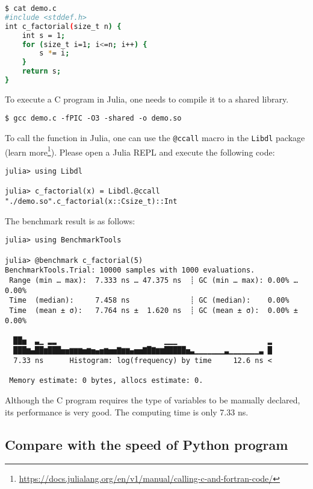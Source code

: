 \documentclass[
  notoc %
]{tufte-book}
\DeclareRobustCommand{\href}[2]{#2\footnote{\url{#1}}}
\newcommand{\passthrough}[1]{#1}
\begin{document}
\begin{lstlisting}[language=bash]
$ cat demo.c
#include <stddef.h>
int c_factorial(size_t n) {
    int s = 1;
    for (size_t i=1; i<=n; i++) {
        s *= i;
    }
    return s;
}
\end{lstlisting}

To execute a C program in Julia, one needs to compile it to a shared
library.

\begin{lstlisting}
$ gcc demo.c -fPIC -O3 -shared -o demo.so
\end{lstlisting}

To call the function in Julia, one can use the
\passthrough{\lstinline!@ccall!} macro in the
\passthrough{\lstinline!Libdl!} package
(\href{https://docs.julialang.org/en/v1/manual/calling-c-and-fortran-code/}{learn
more}). Please open a Julia REPL and execute the following code:

\begin{lstlisting}
julia> using Libdl

julia> c_factorial(x) = Libdl.@ccall "./demo.so".c_factorial(x::Csize_t)::Int
\end{lstlisting}

The benchmark result is as follows:

\begin{lstlisting}
julia> using BenchmarkTools

julia> @benchmark c_factorial(5)
BenchmarkTools.Trial: 10000 samples with 1000 evaluations.
 Range (min … max):  7.333 ns … 47.375 ns  ┊ GC (min … max): 0.00% … 0.00%
 Time  (median):     7.458 ns              ┊ GC (median):    0.00%
 Time  (mean ± σ):   7.764 ns ±  1.620 ns  ┊ GC (mean ± σ):  0.00% ± 0.00%

  ██▅  ▃▁ ▂▂                         ▁▁▁                     ▂
  ███▆▄██▆███▅▅▆▆▆▅▆▅▄▅▆▅▅▇▆▆▄▅▅▇█▇▆▆█████▅▃▁▁▁▁▁▁▁▃▁▁▁▁▁▁▁▃ █
  7.33 ns      Histogram: log(frequency) by time     12.6 ns <

 Memory estimate: 0 bytes, allocs estimate: 0.
\end{lstlisting}

Although the C program requires the type of variables to be manually
declared, its performance is very good. The computing time is only 7.33
ns.

\hypertarget{compare-with-the-speed-of-python-program}{%
\subsection{Compare with the speed of Python
program}\label{compare-with-the-speed-of-python-program}}
\end{document}

